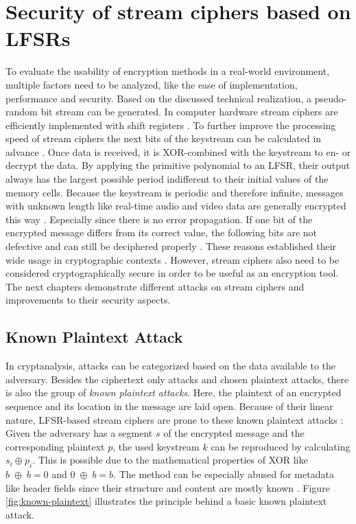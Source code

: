 \section{Security of stream ciphers based on LFSRs}

To evaluate the usability of encryption methods in a real-world environment, multiple factors need to be analyzed, like the ease of implementation, performance and security. Based on the discussed technical realization, a pseudo-random bit stream can be generated. In computer hardware stream ciphers are efficiently implemented with shift registers \cite{Stamp.2007}. To further improve the processing speed of stream ciphers the next bits of the keystream can be calculated in advance \cite[p. 3]{Robshaw.1995}. Once data is received, it is XOR-combined with the keystream to en- or decrypt the data. By applying the primitive polynomial to an LFSR, their output always has the largest possible period indifferent to their initial values of the memory cells. Because the keystream is periodic and therefore infinite, messages with unknown length like real-time audio and video data are generally encrypted this way \cite[p. 181]{Smart.2016}. Especially since there is no error propagation. If one bit of the encrypted message differs from its correct value, the following bits are not defective and can still be deciphered properly \cite[p. 181]{Smart.2016}. These reasons established their wide usage in cryptographic contexts \cite[p. 97]{Pommerening.2000}. However, stream ciphers also need to be considered cryptographically secure in order to be useful as an encryption tool. The next chapters demonstrate different attacks on stream ciphers and improvements to their security aspects.


\subsection{Known Plaintext Attack}

In cryptanalysis, attacks can be categorized based on the data available to the adversary. Besides the ciphertext only attacks and chosen plaintext attacks, there is also the group of \emph{known plaintext attacks}. Here, the plaintext of an encrypted sequence and its location in the message are laid open. \cite[p. 2-3]{Stamp.2007} Because of their linear nature, LFSR-based stream ciphers are prone to these known plaintext attacks \cite[p. 233]{Smart.2016}: Given the adversary has a segment $s$ of the encrypted message and the corresponding plaintext $p$, the used keystream $k$ can be reproduced by calculating $s_i \oplus p_i$. This is possible due to the mathematical properties of XOR like $b\;\oplus\;b = 0$ \space and \space $0\;\oplus\;b = b$. The method can be especially abused for metadata like header fields since their structure and content are mostly known \cite[p. 359]{Eckert.2018}. Figure \ref{fig:known-plaintext} illustrates the principle behind a basic known plaintext attack. \\

